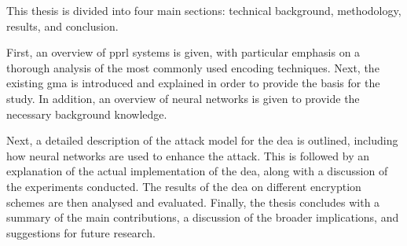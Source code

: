 This thesis is divided into four main sections: technical background, methodology, results, and conclusion.

First, an overview of \ac{pprl} systems is given, with particular emphasis on a thorough analysis of the most commonly used encoding techniques.
Next, the existing \ac{gma} is introduced and explained in order to provide the basis for the study.
In addition, an overview of neural networks is given to provide the necessary background knowledge.

Next, a detailed description of the attack model for the \ac{dea} is outlined, including how neural networks are used to enhance the attack.
This is followed by an explanation of the actual implementation of the \ac{dea}, along with a discussion of the experiments conducted.
The results of the \ac{dea} on different encryption schemes are then analysed and evaluated.
Finally, the thesis concludes with a summary of the main contributions, a discussion of the broader implications, and suggestions for future research.